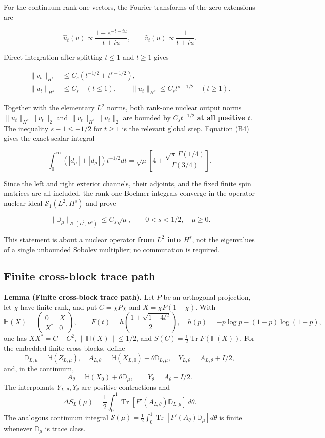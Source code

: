 \documentclass[
  10pt,
  a4paper,
]{article}
\begin{document}
For the continuum rank-one vectors, the Fourier transforms of the zero extensions are

\[
\widehat u_t(u)\propto\frac{1-e^{-t-iu}}{t+iu},\qquad
\widehat v_t(u)\propto\frac1{t+iu}.
\]

Direct integration after splitting \(t\le1\) and \(t\ge1\) gives

\[
\begin{aligned}
\|v_t\|_{H^s}&\le C_s(t^{-1/2}+t^{s-1/2}),\\
\|u_t\|_{H^s}&\le C_s\quad(t\le1),\qquad
\|u_t\|_{H^s}\le C_st^{s-1/2}\quad(t\ge1).
\end{aligned}
\]

Together with the elementary \(L^2\) norms, both rank-one nuclear output norms \(\|u_t\|_{H^s}\|v_t\|_2\) and \(\|v_t\|_{H^s}\|u_t\|_2\) are bounded by \(C_st^{-1/2}\) \textbf{at all positive \(t\)}. The inequality \(s-1\le-1/2\) for \(t\ge1\) is the relevant global step. Equation (B4) gives the exact scalar integral

\[
\int_0^\infty (|d_\mu^+|+|d_\mu^-|)t^{-1/2}dt
=\sqrt\mu\left[4+\frac{\sqrt\pi\,\Gamma(1/4)}{\Gamma(3/4)}\right].
\]

Since the left and right exterior channels, their adjoints, and the fixed finite spin matrices are all included, the rank-one Bochner integrals converge in the operator nuclear ideal \(\mathcal S_1(L^2,H^s)\) and prove

\[
\boxed{\|\mathbb D_\mu\|_{\mathcal S_1(L^2,H^s)}\le C_s\sqrt\mu,
\qquad 0<s<1/2,\quad\mu\ge0.}\tag{B7}
\]

This statement is about a nuclear operator \textbf{from \(L^2\) into \(H^s\)}, not the eigenvalues of a single unbounded Sobolev multiplier; no commutation is required.

\subsection{Finite cross-block trace path}\label{finite-cross-block-trace-path}

\textbf{Lemma (Finite cross-block trace path).} Let \(P\) be an orthogonal projection, let \(\chi\) have finite rank, and put \(C=\chi P\chi\) and \(X=\chi P(1-\chi)\). With \[
\mathbb H(X)=\begin{pmatrix}0&X\\X^*&0\end{pmatrix},\qquad
F(t)=h\!\left(\frac{1+\sqrt{1-4t^2}}2\right),\quad
h(p)=-p\log p-(1-p)\log(1-p),
\] one has \(XX^*=C-C^2\), \(\|\mathbb H(X)\|\le1/2\), and \(S(C)=\tfrac12\operatorname{Tr}F(\mathbb H(X))\). For the embedded finite cross blocks, define \[
\mathbb D_{L,\mu}=\mathbb H(Z_{L,\mu}),\quad
A_{L,\theta}=\mathbb H(X_{L,0})+\theta\mathbb D_{L,\mu},\quad
Y_{L,\theta}=A_{L,\theta}+I/2,
\] and, in the continuum, \[
A_\theta=\mathbb H(X_0)+\theta\mathbb D_\mu,\qquad
Y_\theta=A_\theta+I/2.
\] The interpolants \(Y_{L,\theta},Y_\theta\) are positive contractions and \[
\Delta S_L(\mu)=\frac12\int_0^1
\operatorname{Tr}[F'(A_{L,\theta})\mathbb D_{L,\mu}]\,d\theta.
\] The analogous continuum integral \(\mathcal S(\mu)=\tfrac12\int_0^1\operatorname{Tr}[F'(A_\theta)\mathbb D_\mu]d\theta\) is finite whenever \(\mathbb D_\mu\) is trace class.
\end{document}
